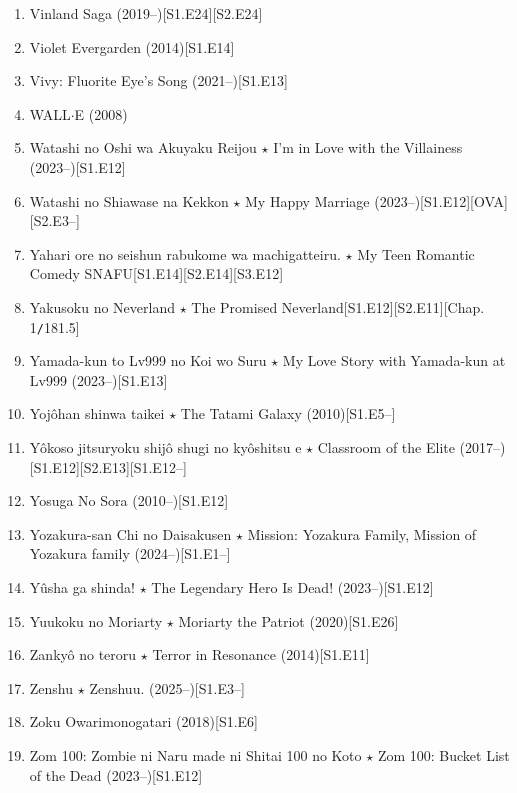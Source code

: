 \documentclass{article}
\begin{document}
\begin{enumerate}
    \item {\sc Vinland Saga} (2019--)\hfill[S1.E24][S2.E24]
    \item {\sc Violet Evergarden} (2014)\hfill[S1.E14]
    \item {\sc Vivy: Fluorite Eye's Song} (2021--)\hfill[S1.E13]
    \item {\sc WALL$\cdot$E} (2008)
    \item {\sc Watashi no Oshi wa Akuyaku Reijou $\star$ I'm in Love with the Villainess} (2023--)\hfill[S1.E12]
    \item {\sc Watashi no Shiawase na Kekkon $\star$ My Happy Marriage} (2023--)\hfill[S1.E12][OVA][S2.E3--]
    \item {\sc Yahari ore no seishun rabukome wa machigatteiru. $\star$ My Teen Romantic Comedy SNAFU}\hfill[S1.E14][S2.E14][S3.E12]
    \item {\sc Yakusoku no Neverland $\star$ The Promised Neverland}\hfill[S1.E12][S2.E11][Chap. 1{\tt/}181.5]
    \item Yamada-kun to Lv999 no Koi wo Suru $\star$ My Love Story with Yamada-kun at Lv999 (2023--)\hfill[S1.E13]
    \item Yojôhan shinwa taikei $\star$ The Tatami Galaxy (2010)\hfill[S1.E5--]
    \item Yôkoso jitsuryoku shijô shugi no kyôshitsu e $\star$ Classroom of the Elite (2017--)\hfill[S1.E12][S2.E13][S1.E12--]
    \item {\sc Yosuga No Sora} (2010--)\hfill[S1.E12]
    \item Yozakura-san Chi no Daisakusen $\star$ Mission: Yozakura Family, Mission of Yozakura family (2024--)\hfill[S1.E1--]
    \item {\sc Yûsha ga shinda! $\star$ The Legendary Hero Is Dead!} (2023--)\hfill[S1.E12]
    \item {\sc Yuukoku no Moriarty $\star$ Moriarty the Patriot} (2020)\hfill[S1.E26]
    \item {\sc Zankyô no teroru $\star$ Terror in Resonance} (2014)\hfill[S1.E11]
    \item Zenshu $\star$ Zenshuu. (2025--)\hfill[S1.E3--]
    \item {\sc Zoku Owarimonogatari} (2018)[S1.E6]
    \item {\sc Zom 100: Zombie ni Naru made ni Shitai 100 no Koto $\star$ Zom 100: Bucket List of the Dead} (2023--)\hfill[S1.E12]
\end{enumerate}

\end{document}
